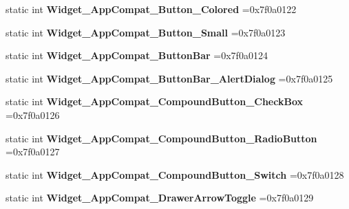 \begin{DoxyCompactItemize}
\item 
\mbox{\label{classandroid_1_1support_1_1design_1_1R_1_1style_a297377cd2e7c3a3f880280f53b260a12}} 
static int {\bfseries Widget\+\_\+\+App\+Compat\+\_\+\+Button\+\_\+\+Colored} =0x7f0a0122
\item 
\mbox{\label{classandroid_1_1support_1_1design_1_1R_1_1style_af98aeb2073ca339988ca305cd6e97487}} 
static int {\bfseries Widget\+\_\+\+App\+Compat\+\_\+\+Button\+\_\+\+Small} =0x7f0a0123
\item 
\mbox{\label{classandroid_1_1support_1_1design_1_1R_1_1style_a0f02e3f3c0fb20145d7a13d683060e0c}} 
static int {\bfseries Widget\+\_\+\+App\+Compat\+\_\+\+Button\+Bar} =0x7f0a0124
\item 
\mbox{\label{classandroid_1_1support_1_1design_1_1R_1_1style_a35592ccf148f85ca5ce6ec8f101853b5}} 
static int {\bfseries Widget\+\_\+\+App\+Compat\+\_\+\+Button\+Bar\+\_\+\+Alert\+Dialog} =0x7f0a0125
\item 
\mbox{\label{classandroid_1_1support_1_1design_1_1R_1_1style_a0843c5d1c95dd5e4971f442ddbf0883c}} 
static int {\bfseries Widget\+\_\+\+App\+Compat\+\_\+\+Compound\+Button\+\_\+\+Check\+Box} =0x7f0a0126
\item 
\mbox{\label{classandroid_1_1support_1_1design_1_1R_1_1style_a498cf3a24baa06130577c1b3671eb7b5}} 
static int {\bfseries Widget\+\_\+\+App\+Compat\+\_\+\+Compound\+Button\+\_\+\+Radio\+Button} =0x7f0a0127
\item 
\mbox{\label{classandroid_1_1support_1_1design_1_1R_1_1style_ad93e3159fdcef0c45590490835f26354}} 
static int {\bfseries Widget\+\_\+\+App\+Compat\+\_\+\+Compound\+Button\+\_\+\+Switch} =0x7f0a0128
\item 
\mbox{\label{classandroid_1_1support_1_1design_1_1R_1_1style_aae79e25043766f60814bb54fd135d450}} 
static int {\bfseries Widget\+\_\+\+App\+Compat\+\_\+\+Drawer\+Arrow\+Toggle} =0x7f0a0129

\end{DoxyCompactItemize}
